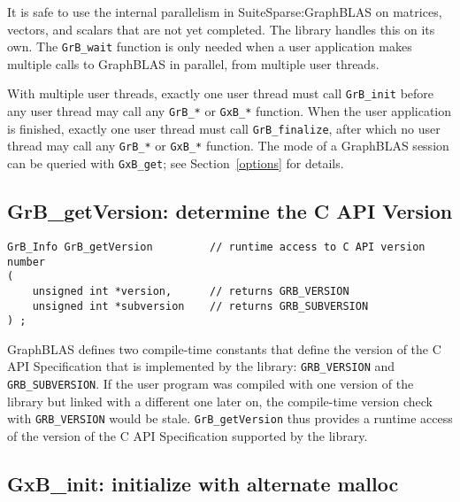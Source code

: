 \documentclass[12pt]{article}
\begin{document}
{It is safe to use the internal parallelism in SuiteSparse:GraphBLAS on
matrices, vectors, and scalars that are not yet completed.  The library
handles this on its own.  The \verb'GrB_wait' function is only
needed when a user application makes multiple calls to GraphBLAS in parallel,
from multiple user threads.

With multiple user threads, exactly one user thread must call \verb'GrB_init'
before any user thread may call any \verb'GrB_*' or \verb'GxB_*' function.
When the user application is finished, exactly one user thread must call
\verb'GrB_finalize', after which no user thread may call any \verb'GrB_*' or
\verb'GxB_*' function.
The mode of a GraphBLAS session can be queried with \verb'GxB_get';
see Section~\ref{options} for details.

\subsection{{\sf GrB\_getVersion:} determine the C API Version} %
\label{getVersion}

\begin{mdframed}[userdefinedwidth=6in]
{\footnotesize
\begin{verbatim}
GrB_Info GrB_getVersion         // runtime access to C API version number
(
    unsigned int *version,      // returns GRB_VERSION
    unsigned int *subversion    // returns GRB_SUBVERSION
) ;
\end{verbatim}
}\end{mdframed}

GraphBLAS defines two compile-time constants that
define the version of the C API Specification
that is implemented by the library:
\verb'GRB_VERSION' and \verb'GRB_SUBVERSION'.
If the user program was compiled with one
version of the library but linked with a different one later on, the
compile-time version check with \verb'GRB_VERSION' would be stale.
\verb'GrB_getVersion' thus provides a runtime access of the version of the C
API Specification supported by the library.

\newpage
\subsection{{\sf GxB\_init:} initialize with alternate malloc} %
\label{xinit}

}
\end{document}
